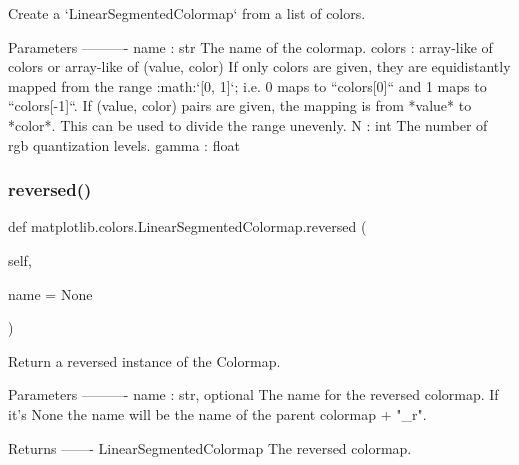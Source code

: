 \begin{DoxyVerb}Create a `LinearSegmentedColormap` from a list of colors.

Parameters
----------
name : str
    The name of the colormap.
colors : array-like of colors or array-like of (value, color)
    If only colors are given, they are equidistantly mapped from the
    range :math:`[0, 1]`; i.e. 0 maps to ``colors[0]`` and 1 maps to
    ``colors[-1]``.
    If (value, color) pairs are given, the mapping is from *value*
    to *color*. This can be used to divide the range unevenly.
N : int
    The number of rgb quantization levels.
gamma : float
\end{DoxyVerb}
 \mbox{\label{classmatplotlib_1_1colors_1_1LinearSegmentedColormap_a0bebcf7401f97a02809b57eaf7d30c66}} 
\subsubsection{\texorpdfstring{reversed()}{reversed()}}
{\footnotesize\ttfamily def matplotlib.\+colors.\+Linear\+Segmented\+Colormap.\+reversed (\begin{DoxyParamCaption}\item[{}]{self,  }\item[{}]{name = {\ttfamily None} }\end{DoxyParamCaption})}

\begin{DoxyVerb}Return a reversed instance of the Colormap.

Parameters
----------
name : str, optional
    The name for the reversed colormap. If it's None the
    name will be the name of the parent colormap + "_r".

Returns
-------
LinearSegmentedColormap
    The reversed colormap.
\end{DoxyVerb}
 \mbox{\label{classmatplotlib_1_1colors_1_1LinearSegmentedColormap_a2f198e251d17bf78aa2d64d067bc50eb}} 
